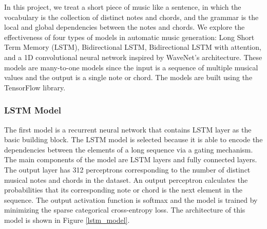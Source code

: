 \documentclass[sigconf,authorversion]{acmart}
\begin{document}
In this project, we treat a short piece of music like 
a sentence, in which the vocabulary is the collection of distinct notes 
and chords, and the grammar is the local and global dependencies between
the notes and chords. We explore the effectiveness of four types of models 
in automatic music generation: Long Short Term Memory (LSTM), Bidirectional
LSTM, Bidirectional LSTM with attention, and a 1D convolutional neural 
network inspired by WaveNet's architecture. These models are many-to-one
models since the input is a sequence of multiple musical values and the output 
is a single note or chord. The models are built using the TensorFlow library.

\subsubsection{LSTM Model}

The first model is a recurrent neural network that contains LSTM layer as 
the basic building block. The LSTM model is selected because it is able to encode
the dependencies between the elements of a long sequence via a gating
mechanism. The main components of the model are LSTM layers and fully connected
layers. The output layer has 312 perceptrons corresponding to the number
of distinct musical notes and chords in the dataset. An output perceptron 
calculates the probabilities that its corresponding note or chord is the next
element in the sequence. The output activation function is softmax and the
model is trained by minimizing the sparse categorical cross-entropy loss.
The architecture of this model is shown in Figure \ref{lstm_model}.
\end{document}
